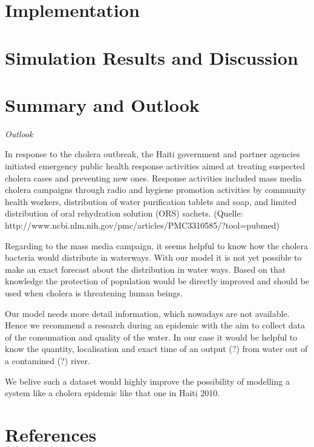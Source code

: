 \documentclass[11pt]{article}
\begin{document}
\section{Implementation}

\section{Simulation Results and Discussion}

\section{Summary and Outlook}



\noindent\textit{Outlook}

In response to the cholera outbreak, the Haiti government and partner agencies initiated emergency public health response activities aimed at treating suspected cholera cases and preventing new ones. Response activities included mass media cholera campaigns through radio and hygiene promotion activities by community health workers, distribution of water purification tablets and soap, and limited distribution of oral rehydration solution (ORS) sachets. (Quelle: http://www.ncbi.nlm.nih.gov/pmc/articles/PMC3310585/?tool=pubmed)

Regarding to the mass media campaign, it seems helpful to know how the cholera bacteria would distribute in waterways. With our model it is not yet possible to make an exact forecast about the distribution in water ways. Based on that knowledge the protection of population would be directly improved and should be used when cholera is threatening human beings.

Our model needs more detail information, which nowadays are not available. Hence we recommend a research during an epidemic with the aim to collect data of the consumation and quality of the water. In our case it would be helpful to know the quantity, localisation and exact time of an output (?) from water out of a contamined (?) river.

We belive such a dataset would highly improve the possibility of modelling a system like a cholera epidemic like that one in Haiti 2010.

\section{References}


\end{document}
